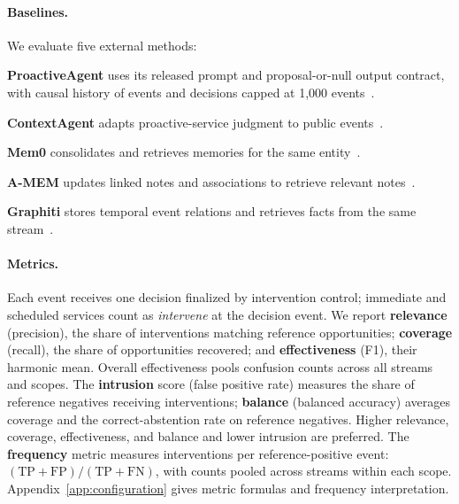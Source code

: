 \paragraph{Baselines.}
We evaluate five external methods:
\begin{list}{}{%
    \settowidth{\labelwidth}{\labelitemi}%
    \setlength{\labelsep}{0.5em}%
    \setlength{\leftmargin}{\labelwidth}%
    \addtolength{\leftmargin}{\labelsep}%
    \setlength{\topsep}{0pt}%
    \setlength{\partopsep}{0pt}%
    \setlength{\itemsep}{0pt}%
    \setlength{\parsep}{0pt}%
}
    \item \textbf{ProactiveAgent} uses its released prompt and proposal-or-null output contract, with causal history of events and decisions capped at 1,000 events~\citep{lu2025proactiveagent,thunlp2026proactiveagentrepo}.
    \item \textbf{ContextAgent} adapts proactive-service judgment to public events~\citep{yang2025contextagent}.
    \item \textbf{Mem0} consolidates and retrieves memories for the same entity~\citep{chhikara2025mem0,mem0ai2026mem0v2012}.
    \item \textbf{A-MEM} updates linked notes and associations to retrieve relevant notes~\citep{xu2025amem}.
    \item \textbf{Graphiti} stores temporal event relations and retrieves facts from the same stream~\citep{zep2026graphiti}.
\end{list}

\paragraph{Metrics.}
Each event receives one decision finalized by intervention control; immediate and scheduled services count as \emph{intervene} at the decision event.
We report \textbf{relevance} (precision), the share of interventions matching reference opportunities; \textbf{coverage} (recall), the share of opportunities recovered; and \textbf{effectiveness} (F1), their harmonic mean.
Overall effectiveness pools confusion counts across all streams and scopes.
The \textbf{intrusion} score (false positive rate) measures the share of reference negatives receiving interventions; \textbf{balance} (balanced accuracy) averages coverage and the correct-abstention rate on reference negatives.
Higher relevance, coverage, effectiveness, and balance and lower intrusion are preferred.
The \textbf{frequency} metric measures interventions per reference-positive event: $(\mathrm{TP}+\mathrm{FP})/(\mathrm{TP}+\mathrm{FN})$, with counts pooled across streams within each scope.
Appendix~\ref{app:configuration} gives metric formulas and frequency interpretation.


